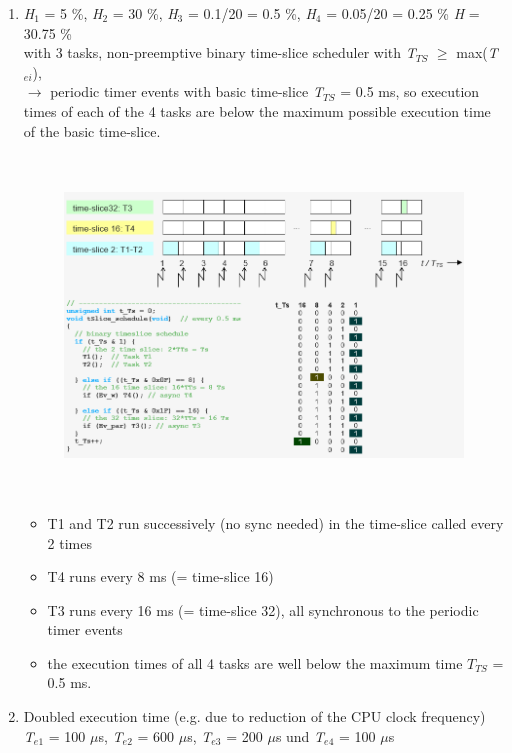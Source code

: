 \begin{enumerate}
\item \textit{H}${}_{1}$ = 5 \%, \textit{H}${}_{2}$ = 30 \%, \textit{H}${}_{3}$ = 0.1/20 = 0.5 \%, \textit{H}${}_{4}$ = 0.05/20 = 0.25 \%  \textit{H} = 30.75 \%\\

with 3 tasks, non-preemptive binary time-slice scheduler with \textit{T${}_{TS}$} $\mathrm{\ge}$ max(\textit{T${}_{ei}$}), \\
$\rightarrow$ periodic timer events with basic time-slice\textit{ T${}_{TS}$} = 0.5 ms, so execution times of each of the 4 tasks are below the maximum possible execution time of the basic time-slice.\\
 
 	\begin{figure}[h]
    \centering
    \includegraphics[width=14cm, height=9cm]{Images/image156.png}
    \label{fig:Fig 107}
    \end{figure}
    
\begin{itemize}
\item T1 and T2 run successively (no sync needed) in the time-slice called every 2 times
\item T4 runs every 8 ms (= time-slice 16)
\item T3 runs every 16 ms (= time-slice 32), all synchronous to the periodic timer events
\item the execution times of all 4 tasks are well below the maximum time $T_{TS}$ = 0.5 ms.
\end{itemize}

\item  Doubled execution time (e.g. due to reduction of the CPU clock frequency)\\  \textit{T}${}_{e1}$ = 100 $\mu$s, \textit{T}${}_{e2}$ = 600 $\mu$s, \textit{T}${}_{e3}$ = 200 $\mu$s und \textit{T}${}_{e4}$ = 100 $\mu$s\textit{ }\\


\end{enumerate}
